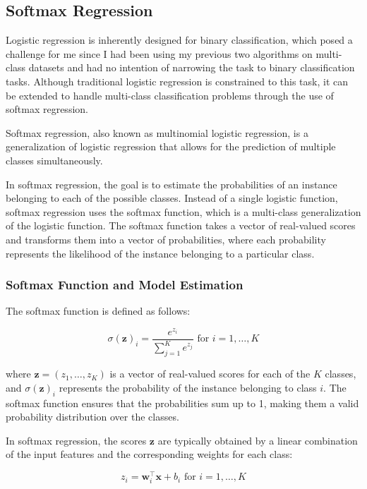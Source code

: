 \documentclass[letterpaper,10pt]{article}
\begin{document}
\subsection{Softmax Regression}
Logistic regression is inherently designed for binary classification, which posed a challenge for me since I had been using my previous two algorithms on multi-class datasets and had no intention of narrowing the task to binary classification tasks. Although traditional logistic regression is constrained to this task, it can be extended to handle multi-class classification problems through the use of softmax regression. \par

Softmax regression, also known as multinomial logistic regression, is a generalization of logistic regression that allows for the prediction of multiple classes simultaneously. \par

In softmax regression, the goal is to estimate the probabilities of an instance belonging to each of the possible classes. Instead of a single logistic function, softmax regression uses the softmax function, which is a multi-class generalization of the logistic function. The softmax function takes a vector of real-valued scores and transforms them into a vector of probabilities, where each probability represents the likelihood of the instance belonging to a particular class. \par

\subsubsection{Softmax Function and Model Estimation}
The softmax function is defined as follows:

\[ \sigma(\mathbf{z})_i = \frac{e^{z_i}}{\sum_{j=1}^{K} e^{z_j}} \text{ for } i = 1, \dots, K \]

where $\mathbf{z} = (z_1, \dots, z_K)$ is a vector of real-valued scores for each of the $K$ classes, and $\sigma(\mathbf{z})_i$ represents the probability of the instance belonging to class $i$. The softmax function ensures that the probabilities sum up to 1, making them a valid probability distribution over the classes. \par

In softmax regression, the scores $\mathbf{z}$ are typically obtained by a linear combination of the input features and the corresponding weights for each class:

\[ z_i = \mathbf{w}_i^\top \mathbf{x} + b_i \text{ for } i = 1, \dots, K \]
\end{document}
